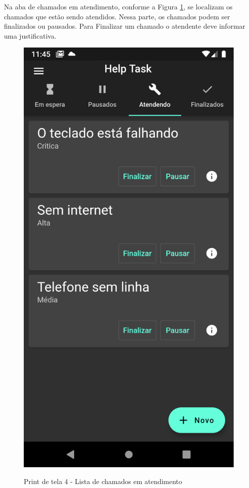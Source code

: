 Na aba de chamados em atendimento, conforme a Figura \ref{fig:4_atendendo}, se localizam os chamados que estão sendo atendidos. Nessa parte, os chamados podem ser finalizados ou pausados. Para Finalizar um chamado o atendente deve informar uma justificativa.

\begin{figure}[htb]
     \caption{Print de tela 4 - Lista de chamados em atendimento}
     \centering
     \begin{frame}{
     \includegraphics [scale = 0.2]{img/screenshots/4_atendendo.png}}
     \end{frame}
     \label{fig:4_atendendo}
 \end{figure}
\newpage

